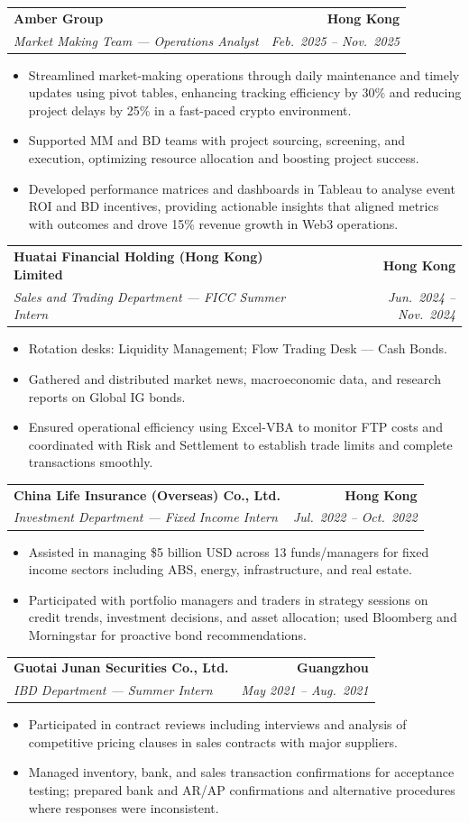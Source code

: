 \documentclass[9pt,a4paper]{article}
\makeatletter
\newcommand{\resumeSubheading}[4]{%
  \vspace{0.6em}%
  \begin{tabular*}{\textwidth}{l@{\extracolsep{\fill}}r}
    \textbf{#1} & \textbf{#2} \\
    \textit{\small #3} & \textit{\small #4} \\
  \end{tabular*}\vspace{0.32em}}
\makeatother
\begin{document}
\resumeSubheading{Amber Group}{Hong Kong}{Market Making Team --- Operations Analyst}{Feb.\ 2025 -- Nov.\ 2025}
\begin{itemize}
  \item Streamlined market-making operations through daily maintenance and timely updates using pivot tables, enhancing tracking efficiency by 30\% and reducing project delays by 25\% in a fast-paced crypto environment.
  \item Supported MM and BD teams with project sourcing, screening, and execution, optimizing resource allocation and boosting project success.
  \item Developed performance matrices and dashboards in Tableau to analyse event ROI and BD incentives, providing actionable insights that aligned metrics with outcomes and drove 15\% revenue growth in Web3 operations.
\end{itemize}

\resumeSubheading{Huatai Financial Holding (Hong Kong) Limited}{Hong Kong}{Sales and Trading Department --- FICC Summer Intern}{Jun.\ 2024 -- Nov.\ 2024}
\begin{itemize}
  \item Rotation desks: Liquidity Management; Flow Trading Desk --- Cash Bonds.
  \item Gathered and distributed market news, macroeconomic data, and research reports on Global IG bonds.
  \item Ensured operational efficiency using Excel-VBA to monitor FTP costs and coordinated with Risk and Settlement to establish trade limits and complete transactions smoothly.
\end{itemize}

\resumeSubheading{China Life Insurance (Overseas) Co., Ltd.}{Hong Kong}{Investment Department --- Fixed Income Intern}{Jul.\ 2022 -- Oct.\ 2022}
\begin{itemize}
  \item Assisted in managing \$5 billion USD across 13 funds/managers for fixed income sectors including ABS, energy, infrastructure, and real estate.
  \item Participated with portfolio managers and traders in strategy sessions on credit trends, investment decisions, and asset allocation; used Bloomberg and Morningstar for proactive bond recommendations.
\end{itemize}

\resumeSubheading{Guotai Junan Securities Co., Ltd.}{Guangzhou}{IBD Department --- Summer Intern}{May 2021 -- Aug.\ 2021}
\begin{itemize}
  \item Participated in contract reviews including interviews and analysis of competitive pricing clauses in sales contracts with major suppliers.
  \item Managed inventory, bank, and sales transaction confirmations for acceptance testing; prepared bank and AR/AP confirmations and alternative procedures where responses were inconsistent.
\end{itemize}
\end{document}
